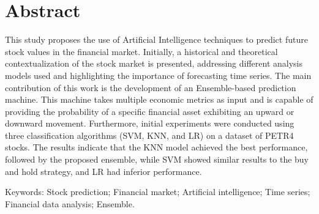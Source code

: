 \chapter*{Abstract}

\noindent This study proposes the use of Artificial Intelligence techniques to predict future stock values in the financial market. Initially, a historical and theoretical contextualization of the stock market is presented, addressing different analysis models used and highlighting the importance of forecasting time series. The main contribution of this work is the development of an Ensemble-based prediction machine. This machine takes multiple economic metrics as input and is capable of providing the probability of a specific financial asset exhibiting an upward or downward movement. Furthermore, initial experiments were conducted using three classification algorithms (SVM, KNN, and LR) on a dataset of PETR4 stocks. The results indicate that the KNN model achieved the best performance, followed by the proposed ensemble, while SVM showed similar results to the buy and hold strategy, and LR had inferior performance.

\vfill%
\noindent Keywords: Stock prediction; Financial market; Artificial intelligence; Time series; Financial data analysis; Ensemble.

